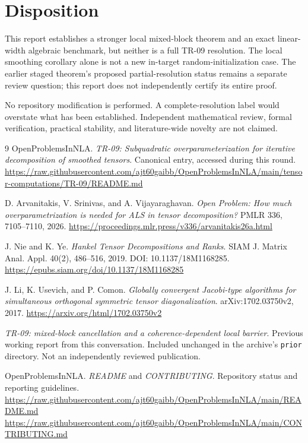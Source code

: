 \documentclass[11pt]{article}
\theoremstyle{remark}\newtheorem{remark}[theorem]{Remark}
\begin{document}
\section{Disposition}
This report establishes a stronger local mixed-block theorem and an exact linear-width algebraic benchmark, but neither is a full TR-09 resolution. The local smoothing corollary alone is not a new in-target random-initialization case. The earlier staged theorem's proposed partial-resolution status remains a separate review question; this report does not independently certify its entire proof.

No repository modification is performed. A complete-resolution label would overstate what has been established. Independent mathematical review, formal verification, practical stability, and literature-wide novelty are not claimed.

\begingroup\small
\begin{thebibliography}{9}
\label{ref:repo}
OpenProblemsInNLA. \emph{TR-09: Subquadratic overparameterization for iterative decomposition of smoothed tensors}. Canonical entry, accessed during this round.\newline
\url{https://raw.githubusercontent.com/ajt60gaibb/OpenProblemsInNLA/main/tensor-computations/TR-09/README.md}

\label{ref:colt}
D. Arvanitakis, V. Srinivas, and A. Vijayaraghavan. \emph{Open Problem: How much overparametrization is needed for ALS in tensor decomposition?} PMLR 336, 7105--7110, 2026.\newline
\url{https://proceedings.mlr.press/v336/arvanitakis26a.html}

\label{ref:hankel}
J. Nie and K. Ye. \emph{Hankel Tensor Decompositions and Ranks}. SIAM J. Matrix Anal. Appl. 40(2), 486--516, 2019. DOI: 10.1137/18M1168285.\newline
\url{https://epubs.siam.org/doi/10.1137/18M1168285}

\label{ref:jacobi}
J. Li, K. Usevich, and P. Comon. \emph{Globally convergent Jacobi-type algorithms for simultaneous orthogonal symmetric tensor diagonalization}. arXiv:1702.03750v2, 2017.\newline
\url{https://arxiv.org/html/1702.03750v2}

\label{ref:previous}
\emph{TR-09: mixed-block cancellation and a coherence-dependent local barrier}. Previous working report from this conversation. Included unchanged in the archive's \texttt{prior} directory. Not an independently reviewed publication.

\label{ref:rubric}
OpenProblemsInNLA. \emph{README} and \emph{CONTRIBUTING}. Repository status and reporting guidelines.\newline
\url{https://raw.githubusercontent.com/ajt60gaibb/OpenProblemsInNLA/main/README.md}\newline
\url{https://raw.githubusercontent.com/ajt60gaibb/OpenProblemsInNLA/main/CONTRIBUTING.md}
\end{thebibliography}
\endgroup
\end{document}

